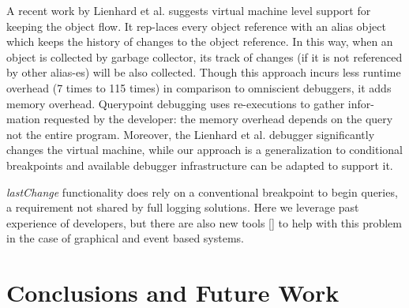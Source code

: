 \documentclass[preprint]{sigplanconf}
\begin{document}
A recent work by Lienhard et al.\cite{Lienhard} suggests virtual machine level support for keeping the object flow. It rep-laces every object reference with an alias object which keeps the history of changes to the object reference. In this way, when an object is collected by garbage collector, its track of changes (if it is not referenced by other alias-es) will be also collected. Though this approach incurs less runtime overhead (7 times to 115 times) in comparison to omniscient debuggers, it adds memory overhead. Querypoint debugging uses re-executions to gather infor-mation requested by the developer: the memory overhead depends on the query not the entire program. Moreover, the Lienhard et al. debugger significantly changes the virtual machine, while our approach is a generalization to conditional breakpoints and available debugger infrastructure can be adapted to support it. 
 
\textit{lastChange} functionality does rely on a conventional breakpoint to begin queries, a requirement not shared by full logging solutions.  Here we leverage past experience of developers, but there are also new tools [] to help with this problem in the case of graphical and event based systems.


\section{Conclusions and Future Work}






\end{document}
